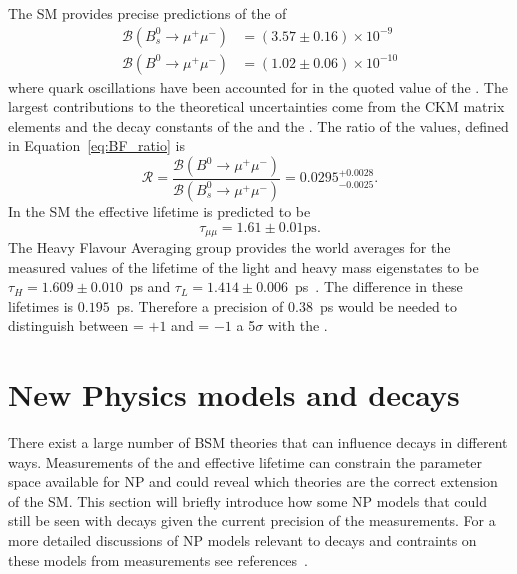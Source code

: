 The SM provides precise predictions of the \bmumu \BFs of~\cite{Bobeth:2013uxa, Aoki:2016frl, Fleischer:2017ltw}
\begin{align}
\mathcal{B}(B^0_{s} \to \mu^+ \mu^-)& = (3.57 \pm 0.16) \times 10^{-9}\\
\mathcal{B}(B^0 \to\mu^+ \mu^-)& = (1.02 \pm 0.06) \times 10^{-10}
\end{align}
where quark oscillations have been accounted for in the quoted value of the \bsmumu \BF. The largest contributions to the theoretical uncertainties come from the CKM matrix elements and the decay constants of the \bs and the \bd.
The ratio of the \BF values, defined in Equation~\ref{eq:BF_ratio} is~\cite{CMS:2014xfa} 
\begin{equation}
\mathcal{R} = \frac{\mathcal{B}(B^0 \to\mu^+ \mu^-)}{\mathcal{B}(B^0_{s} \to \mu^+ \mu^-)} = 0.0295^{+0.0028}_{-0.0025}.
\end{equation}
In the SM the \bsmumu effective lifetime is predicted to be~\cite{Fleischer:2017ltw}
\begin{equation}
\tau_{\mu\mu} = 1.61 \pm 0.01 \mathrm{ps}.
\end{equation}
The Heavy Flavour Averaging group provides the world averages for the measured values of the lifetime of the light and heavy \bs mass eigenstates to be $\tau_{H} = 1.609 \pm 0.010$~ps and $\tau_{L} = 1.414 \pm 0.006$~ps~\cite{Amhis:2016xyh}.
The difference in these lifetimes is $0.195$~ps.
Therefore a precision of 0.38~ps would be needed to distinguish between \ADG = $+1$ and \ADG = $-1$ a 5$\sigma$ with the \el. 



\section{New Physics models and \bmumu decays}
\label{sec:NPmodels}
There exist a large number of BSM theories that can influence \bmumu decays in different ways. Measurements of the \bmumu \BFs and \bsmumu effective lifetime can constrain the parameter space available for NP and could reveal which theories are the correct extension of the SM. This section will briefly introduce how some NP models that could still be seen with \bmumu decays given the current precision of the \BF measurements. %
For a more detailed discussions of NP models relevant to \bmumu decays and contraints on these models from measurements see references~\cite{Buras:2013uqa,Knegjens:2014zva,Altmannshofer:2014rta}.

